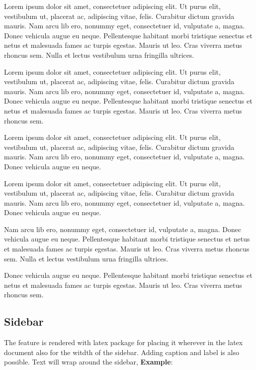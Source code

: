 \documentclass[12pt,a4paper]{report}
\begin{document}
\begin{note}
	Lorem ipsum dolor sit amet, consectetuer adipiscing elit. Ut purus elit, vestibulum ut, placerat ac, adipiscing vitae, felis. Curabitur dictum gravida mauris. Nam arcu lib ero, nonummy eget, consectetuer id, vulputate a, magna. Donec vehicula augue eu neque. Pellentesque habitant morbi tristique senectus et netus et malesuada fames ac turpis egestas. Mauris ut leo. Cras viverra metus rhoncus sem. Nulla et lectus vestibulum urna fringilla ultrices.
\end{note}
\begin{tip}
Lorem ipsum dolor sit amet, consectetuer adipiscing elit. Ut purus elit, vestibulum ut, placerat ac, adipiscing vitae, felis. Curabitur dictum gravida mauris. Nam arcu lib ero, nonummy eget, consectetuer id, vulputate a, magna. Donec vehicula augue eu neque. Pellentesque habitant morbi tristique senectus et netus et malesuada fames ac turpis egestas. Mauris ut leo. Cras viverra metus rhoncus sem.
\end{tip}
\begin{warning}
Lorem ipsum dolor sit amet, consectetuer adipiscing elit. Ut purus elit, vestibulum ut, placerat ac, adipiscing vitae, felis. Curabitur dictum gravida mauris. Nam arcu lib ero, nonummy eget, consectetuer id, vulputate a, magna. Donec vehicula augue eu neque. 
\end{warning}
\begin{error}
Lorem ipsum dolor sit amet, consectetuer adipiscing elit. Ut purus elit, vestibulum ut, placerat ac, adipiscing vitae, felis. Curabitur dictum gravida mauris. Nam arcu lib ero, nonummy eget, consectetuer id, vulputate a, magna. Donec vehicula augue eu neque.
\end{error}
\begin{note}
	Nam arcu lib ero, nonummy eget, consectetuer id, vulputate a, magna. Donec vehicula augue eu neque. Pellentesque habitant morbi tristique senectus et netus et malesuada fames ac turpis egestas. Mauris ut leo. Cras viverra metus rhoncus sem. Nulla et lectus vestibulum urna fringilla ultrices.
\end{note}
\begin{tip}
Donec vehicula augue eu neque. Pellentesque habitant morbi tristique senectus et netus et malesuada fames ac turpis egestas. Mauris ut leo. Cras viverra metus rhoncus sem.
\end{tip}

\subsection{Sidebar}
The  feature is rendered with  latex package for placing it wherever in the latex document also for the witdth of the sidebar. Adding caption and label is also possible. Text will wrap around the sidebar, \textbf{Example}:\\
\end{document}

